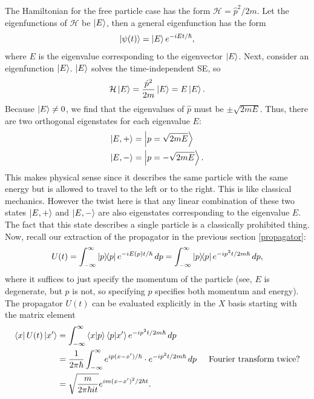 \documentclass{book}
\theoremstyle{definition}
\newcommand{\ham}{\mathcal{H}}
\newcommand{\f}[2]{\frac{#1}{#2}}
\begin{document}
The Hamiltonian for the free particle case has the form $\ham = \hat{p}^2/2m$. Let the eigenfunctions of $\ham$ be $\ket{E}$, then a general eigenfunction has the form
\begin{align}
\ket{\psi(t)} = \ket{E}e^{-iEt/\hbar},
\end{align}
where $E$ is the eigenvalue corresponding to the eigenvector $\ket{E}$. Next, consider an eigenfunction $\ket{E}$. $\ket{E}$ solves the time-independent SE, so
\begin{align}
\ham\ket{E} = \f{\hat{p}^2}{2m}\ket{E} = E\ket{E}.
\end{align}
Because $\ket{E} \neq 0$, we find that the eigenvalues of $\hat{p}$ must be $\pm \sqrt{2mE}$. Thus, there are two orthogonal eigenstates for each eigenvalue $E$:
\begin{align}
\ket{E, +} &= \ket{p = \sqrt{2mE}}\\
\ket{E, -} &= \ket{p = -\sqrt{2mE}}.
\end{align}
This makes physical sense since it describes the same particle with the same energy but is allowed to travel to the left or to the right. This is like classical mechanics. However the twist here is that any linear combination of these two states $\ket{E, +}$ and $\ket{E, -}$ are also eigenstates corresponding to the eigenvalue $E$. The fact that this state describes a single particle is a classically prohibited thing.\\

Now, recall our extraction of the propagator in the previous section \eqref{propagator}:
\begin{align}
U(t) = \int^\infty_{-\infty} \ketbra{p} e^{-iE(p)t/\hbar}\,dp  = \int^\infty_{-\infty} \ketbra{p} e^{-ip^2t/2m\hbar}\,dp,
\end{align}
where it suffices to just specify the momentum of the particle (see, $E$ is degenerate, but $p$ is not, so specifying $p$ specifies both momentum and energy). \\

The propagator $U(t)$ can be evaluated explicitly in the $X$ basis starting with the matrix element
\begin{align}\label{free-propagator}
\bra{x}U(t)\ket{x'} &= \int_{-\infty}^\infty \braket{x}{p}\braket{p}{x'}e^{-ip^2t/2m\hbar}\,dp\\
&= \f{1}{2\pi \hbar}\int_{-\infty}^\infty e^{ip(x-x')/\hbar} \cdot e^{-ip^2 t/2m\hbar}\,dp  \hspace{0.5cm}\text{Fourier transform twice?}\\
&= \sqrt{\f{m}{2\pi \hbar it}} e^{im(x-x')^2/2\hbar t}.
\end{align}
\end{document}
